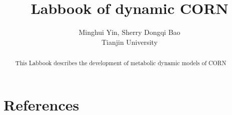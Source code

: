 \documentclass[a4paper,10pt]{article}
\begin{document}
 
\title{Labbook of dynamic CORN} \author{Minghui Yin, Sherry Dongqi Bao \\Tianjin University}
\maketitle 
\begin{abstract}
This Labbook describes the development of metabolic dynamic
models of CORN
\end{abstract}

%


%

\section*{References}
\printbibliography
\end{document}
